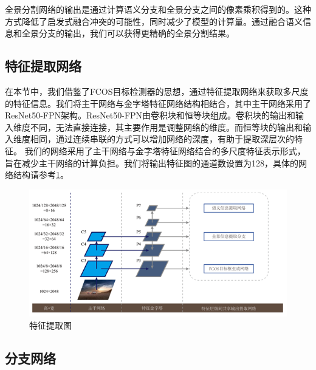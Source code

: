 全景分割网络的输出是通过计算语义分支和全景分支之间的像素乘积得到的。这种方式降低了启发式融合冲突的可能性，同时减少了模型的计算量。通过融合语义信息和全景分支的输出，我们可以获得更精确的全景分割结果。

\subsection{特征提取网络}
在本节中，我们借鉴了FCOS目标检测器的思想，通过特征提取网络来获取多尺度的特征信息。我们将主干网络与金字塔特征网络结构相结合，其中主干网络采用了ResNet50-FPN架构。ResNet50-FPN由卷积块和恒等块组成。卷积块的输出和输入维度不同，无法直接连接，其主要作用是调整网络的维度。而恒等块的输出和输入维度相同，通过连续串联的方式可以增加网络的深度，有助于提取深层次的特征。
我们的网络采用了主干网络与金字塔特征网络结合的多尺度特征表示形式，旨在减少主干网络的计算负担。我们将输出特征图的通道数设置为128，具体的网络结构请参考\cref*{fig2}。

\begin{figure}[!h] %
    \centering %
    \includegraphics[scale=0.8]{fig/chap2/图片2.png} %
    \caption{特征提取图}
    \label{fig2} %
    \end{figure}

\subsection{分支网络}

